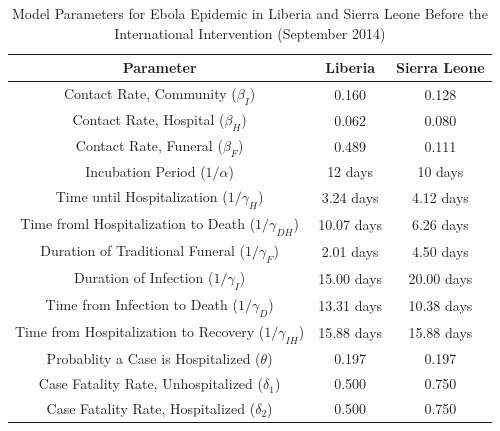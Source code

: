 \documentclass[10pt]{article}
\begin{document}
\begin{table}[ht]
\caption{Model Parameters for Ebola Epidemic in Liberia and Sierra Leone Before the International Intervention (September 2014)} %
\centering %
\begin{tabular}{c c c } 
\hline\hline %
Parameter & Liberia & Sierra Leone \\ [0.5ex] %
\hline %
Contact Rate, Community  ($\beta_{I}$) & 0.160 & 0.128  \\ 
Contact Rate, Hospital  ($\beta_{H}$) & 0.062 & 0.080  \\
Contact Rate, Funeral  ($\beta_{F}$) & 0.489 & 0.111 \\
Incubation Period (${1}/{\alpha}$) & 12 days & 10 days  \\
Time until Hospitalization (${1}/{\gamma_{H}}$) & 3.24 days & 4.12 days  \\
Time froml Hospitalization to Death (${1}/{\gamma_{DH}}$) & 10.07 days & 6.26 days  \\ 
Duration of Traditional Funeral (${1}/{\gamma_{F}}$) & 2.01 days & 4.50 days  \\
Duration of Infection (${1}/{\gamma_{I}}$) & 15.00 days & 20.00 days  \\
Time from Infection to Death (${1}/{\gamma_{D}}$) & 13.31 days & 10.38 days  \\
Time from Hospitalization to Recovery (${1}/{\gamma_{IH}}$) & 15.88 days & 15.88 days  \\
Probablity a Case is Hospitalized ($\theta$) & 0.197 & 0.197  \\
Case Fatality Rate, Unhospitalized ($\delta_{1}$) & 0.500 & 0.750  \\
Case Fatality Rate, Hospitalized ($\delta_{2}$) & 0.500 & 0.750  \\ [1ex] 
\hline 
\end{tabular}
\label{tab:parameters}
\end{table}
%
%
% 
%        
%  
%       
%
%
%
%        
%
%
\end{document}
